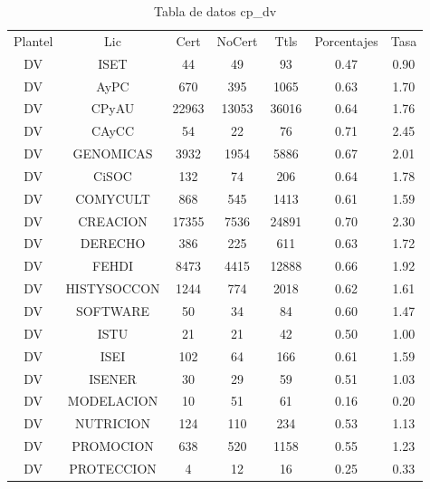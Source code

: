 \documentclass[12pt]{article}
\begin{document}
\begin{table}[h]
\centering
\begin{tabular}{ccccccc}

Plantel & Lic & Cert & NoCert & Ttls & Porcentajes & Tasa \\

DV & ISET & 44 & 49 & 93 & 0.47 & 0.90 \\
DV & AyPC & 670 & 395 & 1065 & 0.63 & 1.70 \\
DV & CPyAU & 22963 & 13053 & 36016 & 0.64 & 1.76 \\
DV & CAyCC & 54 & 22 & 76 & 0.71 & 2.45 \\
DV & GENOMICAS & 3932 & 1954 & 5886 & 0.67 & 2.01 \\
DV & CiSOC & 132 & 74 & 206 & 0.64 & 1.78 \\
DV & COMYCULT & 868 & 545 & 1413 & 0.61 & 1.59 \\
DV & CREACION & 17355 & 7536 & 24891 & 0.70 & 2.30 \\
DV & DERECHO & 386 & 225 & 611 & 0.63 & 1.72 \\
DV & FEHDI & 8473 & 4415 & 12888 & 0.66 & 1.92 \\
DV & HISTYSOCCON & 1244 & 774 & 2018 & 0.62 & 1.61 \\
DV & SOFTWARE & 50 & 34 & 84 & 0.60 & 1.47 \\
DV & ISTU & 21 & 21 & 42 & 0.50 & 1.00 \\
DV & ISEI & 102 & 64 & 166 & 0.61 & 1.59 \\
DV & ISENER & 30 & 29 & 59 & 0.51 & 1.03 \\
DV & MODELACION & 10 & 51 & 61 & 0.16 & 0.20 \\
DV & NUTRICION & 124 & 110 & 234 & 0.53 & 1.13 \\
DV & PROMOCION & 638 & 520 & 1158 & 0.55 & 1.23 \\
DV & PROTECCION & 4 & 12 & 16 & 0.25 & 0.33 \\

\end{tabular}
\caption{Tabla de datos cp\_dv}
\end{table}
\end{document}
